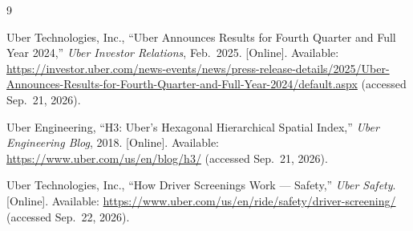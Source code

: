 \begin{thebibliography}{9}

Uber Technologies, Inc.,
``Uber Announces Results for Fourth Quarter and Full Year 2024,''
\emph{Uber Investor Relations}, Feb.\ 2025. [Online]. Available:
\url{https://investor.uber.com/news-events/news/press-release-details/2025/Uber-Announces-Results-for-Fourth-Quarter-and-Full-Year-2024/default.aspx}
(accessed Sep.\ 21, 2026).

Uber Engineering,
``H3: Uber's Hexagonal Hierarchical Spatial Index,''
\emph{Uber Engineering Blog}, 2018. [Online]. Available:
\url{https://www.uber.com/us/en/blog/h3/}
(accessed Sep.\ 21, 2026).

Uber Technologies, Inc.,
``How Driver Screenings Work --- Safety,''
\emph{Uber Safety}. [Online]. Available:
\url{https://www.uber.com/us/en/ride/safety/driver-screening/}
(accessed Sep.\ 22, 2026).

\end{thebibliography}